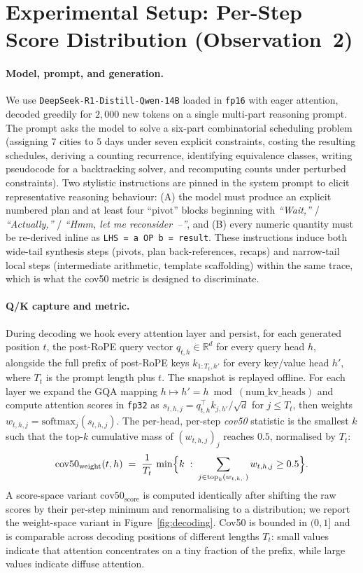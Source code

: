 \section{Experimental Setup: Per-Step Score Distribution (Observation~2)}
\label{app:score-distribution}

\paragraph{Model, prompt, and generation.}
We use \texttt{DeepSeek-R1-Distill-Qwen-14B} loaded in \texttt{fp16} with
eager attention, decoded greedily for $2{,}000$ new tokens on a single
multi-part reasoning prompt. The prompt asks the model to solve a six-part
combinatorial scheduling problem (assigning $7$ cities to $5$ days under
seven explicit constraints, costing the resulting schedules, deriving a
counting recurrence, identifying equivalence classes, writing pseudocode for
a backtracking solver, and recomputing counts under perturbed constraints).
Two stylistic instructions are pinned in the system prompt to elicit
representative reasoning behaviour: (A) the model must produce an explicit
numbered plan and at least four ``pivot'' blocks beginning with
\textit{``Wait,''} / \textit{``Actually,''} / \textit{``Hmm, let me reconsider~--''},
and (B) every numeric quantity must be re-derived inline as
\texttt{LHS = a OP b = result}. These instructions induce both wide-tail
synthesis steps (pivots, plan back-references, recaps) and narrow-tail local
steps (intermediate arithmetic, template scaffolding) within the same trace,
which is what the cov50 metric is designed to discriminate.

\paragraph{Q/K capture and metric.}
During decoding we hook every attention layer and persist, for each generated
position $t$, the post-RoPE query vector $q_{t,h}\in\mathbb{R}^{d}$ for every
query head $h$, alongside the full prefix of post-RoPE keys
$k_{1:T_t,h'}$ for every key/value head $h'$, where $T_t$ is the prompt
length plus $t$. The snapshot is replayed offline. For each layer we
expand the GQA mapping $h \mapsto h' = h \bmod (\text{num\_kv\_heads})$ and
compute attention scores in \texttt{fp32} as $s_{t,h,j} = q_{t,h}^{\top}
k_{j,h'} / \sqrt{d}$ for $j \le T_t$, then weights $w_{t,h,j} =
\mathrm{softmax}_j(s_{t,h,j})$. The per-head, per-step \emph{cov50} statistic
is the smallest $k$ such that the top-$k$ cumulative mass of
$(w_{t,h,j})_{j}$ reaches $0.5$, normalised by $T_t$:
$$
\mathrm{cov50}_{\text{weight}}(t,h) \;=\; \frac{1}{T_t}\,\min\Bigl\{k \;:\;
\sum_{j \in \mathrm{top}_k(w_{t,h,\cdot})} w_{t,h,j} \ge 0.5\Bigr\}.
$$
A score-space variant $\mathrm{cov50}_{\text{score}}$ is computed identically
after shifting the raw scores by their per-step minimum and renormalising to
a distribution; we report the weight-space variant in
Figure~\ref{fig:decoding}. Cov50 is bounded in $(0,1]$ and is comparable
across decoding positions of different lengths $T_t$: small values indicate
that attention concentrates on a tiny fraction of the prefix, while large
values indicate diffuse attention.

